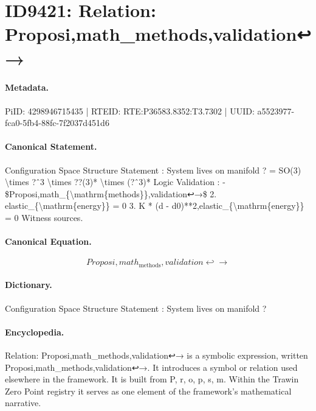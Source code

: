 \section*{ID9421: Relation: Proposi,math\_methods,validation↩→}
\paragraph{Metadata.}
PiID: 4298946715435 | RTEID: RTE:P36583.8352:T3.7302 | UUID: a5523977-fca0-5fb4-88fc-7f2037d451d6

\paragraph{Canonical Statement.}
Configuration Space Structure Statement : System lives on manifold ? = SO(3) \textbackslash{}times ?ˆ3 \textbackslash{}times ??(3)* \textbackslash{}times (?ˆ3)* Logic Validation : - \$Proposi,math\_\{\textbackslash{}mathrm\{methods\}\},validation↩→\$ 2. elastic\_\{\textbackslash{}mathrm\{energy\}\} = 0 3. K * (d - d0)**2,elastic\_\{\textbackslash{}mathrm\{energy\}\} = 0 Witness sources.

\paragraph{Canonical Equation.}
\[
Proposi,math_{\mathrm{methods}},validation↩→
\]

\paragraph{Dictionary.}
Configuration Space Structure Statement : System lives on manifold ?

\paragraph{Encyclopedia.}
Relation: Proposi,math\_methods,validation↩→ is a symbolic expression, written Proposi,math\_methods,validation↩→. It introduces a symbol or relation used elsewhere in the framework. It is built from P, r, o, p, s, m. Within the Trawin Zero Point registry it serves as one element of the framework's mathematical narrative.
